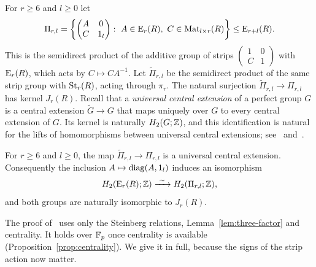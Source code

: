 For $r\geq6$ and $l\geq0$ let
\[
 \Pi_{r,l}=\left\{\begin{pmatrix}A&0\\C&1_l\end{pmatrix}:\ A\in\E_r(R),\ C\in\grpMat_{l\times r}(R)\right\}
 \leq\E_{r+l}(R).
\]
This is the semidirect product of the additive group of strips
$\left(\begin{smallmatrix}1&0\\C&1\end{smallmatrix}\right)$ with $\operatorname{E}_r(R)$, which acts by $C\mapsto CA^{-1}$. Let
$\widetilde\Pi_{r,l}$ be the semidirect product of the same strip group with $\operatorname{St}_r(R)$, acting through
$\pi_r$. The natural surjection $\widetilde\Pi_{r,l}\to\Pi_{r,l}$ has kernel $J_r(R)$. Recall that a
\emph{universal central extension} of a perfect group $G$ is a central extension $\widetilde G\to G$ that maps uniquely
over $G$ to every central extension of $G$. Its kernel is naturally $H_2(G;\mathbb Z)$, and this identification is natural for
the lifts of homomorphisms between universal central extensions; see~\cite[Section~5]{Milnor1971}
and~\cite[Section~III.5]{WeibelKbook}.

\begin{lemma}\label{lem:st-uce}
For $r\geq6$ and $l\geq0$, the map $\widetilde\Pi_{r,l}\to\Pi_{r,l}$ is a universal central extension.
Consequently the inclusion $A\mapsto\operatorname{diag}(A,1_l)$ induces an isomorphism
\[
 H_2(\E_r(R);\Z)\xrightarrow{\ \sim\ }H_2(\Pi_{r,l};\Z),
\]
and both groups are naturally isomorphic to $J_r(R)$.
\end{lemma}

The proof of~\cite[Lemma~7.3]{OAI247rf} uses only the Steinberg relations, Lemma~\ref{lem:three-factor} and
centrality. It holds over $\mathbb F_p$ once centrality is available (Proposition~\ref{prop:centrality}). We give it in full,
because the signs of the strip action now matter.

